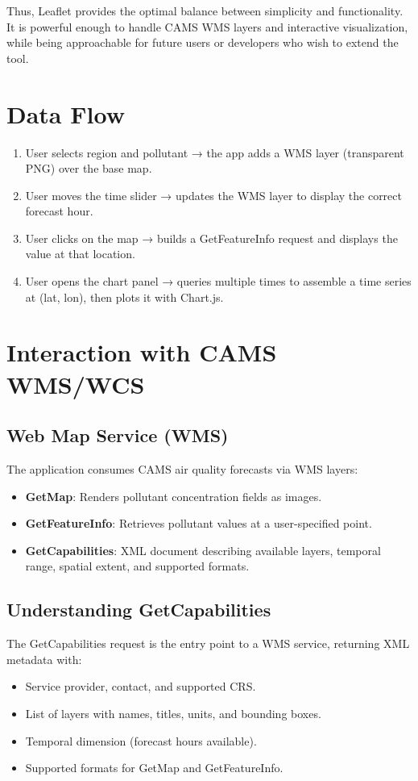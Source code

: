 Thus, Leaflet provides the optimal balance between simplicity and functionality. It is powerful enough to handle CAMS WMS layers and interactive visualization, while being approachable for future users or developers who wish to extend the tool.  

\section{Data Flow}
\begin{enumerate}
	\item User selects region and pollutant → the app adds a WMS layer (transparent PNG) over the base map.
	\item User moves the time slider → updates the WMS layer to display the correct forecast hour.
	\item User clicks on the map → builds a GetFeatureInfo request and displays the value at that location.
	\item User opens the chart panel → queries multiple times to assemble a time series at (lat, lon), then plots it with Chart.js.
\end{enumerate}

\section{Interaction with CAMS WMS/WCS}
\subsection{Web Map Service (WMS)}
The application consumes CAMS air quality forecasts via WMS layers:
\begin{itemize}
	\item \textbf{GetMap}: Renders pollutant concentration fields as images.
	\item \textbf{GetFeatureInfo}: Retrieves pollutant values at a user-specified point.
	\item \textbf{GetCapabilities}: XML document describing available layers, temporal range, spatial extent, and supported formats.
\end{itemize}

\subsection{Understanding GetCapabilities}
The GetCapabilities request is the entry point to a WMS service, returning XML metadata with:
\begin{itemize}
	\item Service provider, contact, and supported CRS.
	\item List of layers with names, titles, units, and bounding boxes.
	\item Temporal dimension (forecast hours available).
	\item Supported formats for GetMap and GetFeatureInfo.
\end{itemize}

